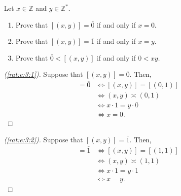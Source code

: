 \begin{exercise} %
	\label{rat:e:3}
	Let $x \in \mathbb{Z}$ and $y \in \mathbb{Z}^{*}$.
	\begin{enumerate}
		\item \label{rat:e:3:1}
		      Prove that $[(x, y)] = \overline{0}$ if and only if $x = 0$.
		\item \label{rat:e:3:2}
		      Prove that $[(x, y)] = \overline{1}$ if and only if $x = y$.
		\item \label{rat:e:3:3}
		      Prove that $\overline{0} < [(x, y)]$ if and only if $0 < x y$.
	\end{enumerate}
\end{exercise}

\begin{proof}[(\ref{rat:e:3:1})]
	Suppose that $[(x, y)] = \overline{0}$. Then,
	\begin{align*}
		[(x, y)] = \overline{0} & \iff [(x, y)] = [(0, 1)]   \\
		                        & \iff (x, y) \asymp (0, 1)  \\
		                        & \iff x \cdot 1 = y \cdot 0 \\
		                        & \iff x = 0.
	\end{align*}
\end{proof}

\begin{proof}[(\ref{rat:e:3:2})]
	Suppose that $[(x, y)] = \overline{1}$. Then,
	\begin{align*}
		[(x, y)] = \overline{1} & \iff [(x, y)] = [(1, 1)]   \\
		                        & \iff (x, y) \asymp (1, 1)  \\
		                        & \iff x \cdot 1 = y \cdot 1 \\
		                        & \iff x = y.
	\end{align*}
\end{proof}

